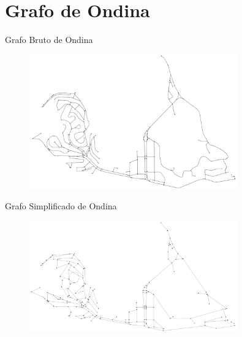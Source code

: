 \documentclass[aspectratio=169,xcolor=table]{beamer}
\begin{document}
\section{Grafo de Ondina}
\begin{frame}{Grafo Bruto de Ondina}
    \begin{figure}
        \centering
        \includegraphics[width=0.8\textwidth]{ondina_grafo_bruto}
    \end{figure}
\end{frame}

\begin{frame}{Grafo Simplificado de Ondina}
    \begin{figure}
        \centering
        \includegraphics[width=0.8\textwidth]{ondina_grafo_simplificado}
    \end{figure}
\end{frame}

\end{document}
